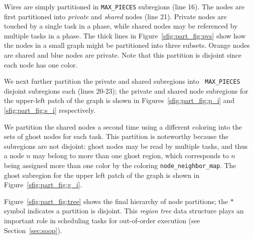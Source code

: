Wires are simply partitioned in {\tt MAX\_PIECES} subregions (line 16).  
The nodes are first partitioned into 
{\em private} and {\em shared} nodes (line 21).  Private nodes
are touched by a single task in a phase, while shared nodes may
be referenced by multiple tasks in a phase.  The thick lines in Figure~\ref{sfig:part_fig:pvs}
show how the nodes in a small graph might be partitioned into three subsets.  Orange
nodes are shared and blue nodes are private.  Note that
this partition is disjoint since each node has one color.

We next further partition the private and shared subregions into {\tt
  MAX\_PIECES} disjoint subregions each (lines 20-23); the private and shared node subregions
for the upper-left patch of the graph is shown in
Figures~\ref{sfig:part_fig:p_i} and \ref{sfig:part_fig:s_i}
respectively.  

We partition the shared nodes a second time using a
different coloring into the sets of ghost nodes for each task.  This 
partition is noteworthy because the subregions are not disjoint:
ghost nodes may be read by multiple tasks, and thus a node $n$  may belong 
to more than one ghost region, which corresponds to $n$ being assigned
more than one color by the coloring {\tt node\_neighbor\_map}.
The ghost subregion for the upper left patch of the graph
 is shown in Figure~\ref{sfig:part_fig:g_i}.

Figure~\ref{sfig:part_fig:tree} shows the final hierarchy of node
partitions;  the $*$ symbol indicates a partition is disjoint. This
{\em region tree} data structure plays an important role in scheduling
tasks for out-of-order execution (see Section~\ref{sec:soop}).



